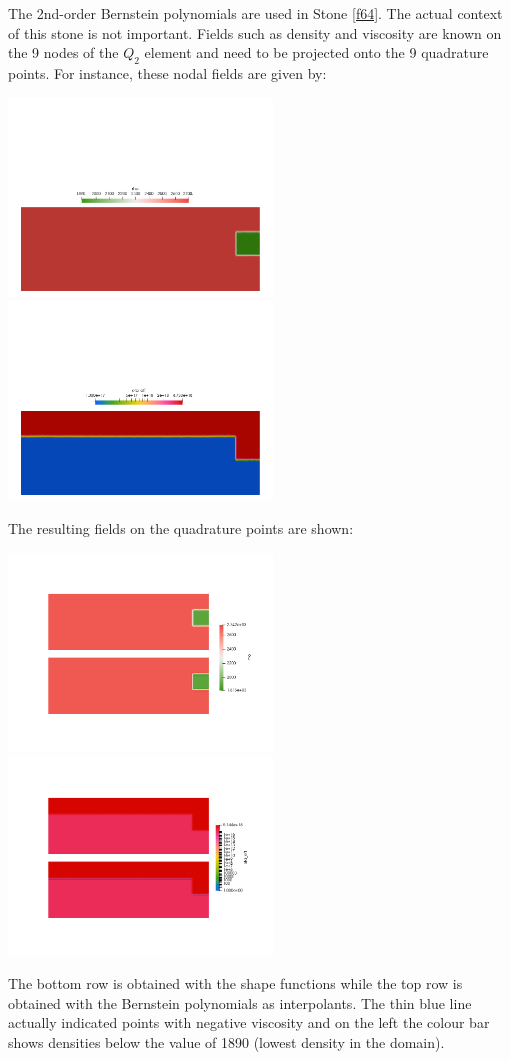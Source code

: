 The 2nd-order Bernstein polynomials are used in Stone \ref{f64}. The actual context of this stone is not 
important. Fields such as density and viscosity are known on the 
9 nodes of the $Q_2$ element and need to be projected onto the 9 quadrature points. 
For instance, these nodal fields are given by:
\begin{center}
\includegraphics[width=7cm]{images/bernstein/rhonodal.png}
\includegraphics[width=7cm]{images/bernstein/etaeffnodal.png}
\end{center}
The resulting fields on the quadrature points are shown:
\begin{center}
\includegraphics[width=7cm]{images/bernstein/qrho.png}
\includegraphics[width=7cm]{images/bernstein/qetaeff.png}
\end{center}
The bottom row is obtained with the shape functions while the top row is obtained with the Bernstein 
polynomials as interpolants. The thin blue line actually indicated points with negative viscosity and 
on the left the colour bar shows densities below the value of 1890 (lowest density in the domain).


 







 

